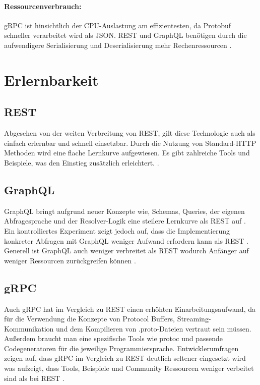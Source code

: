 \paragraph{Ressourcenverbrauch:}  
gRPC ist hinsichtlich der CPU-Auslastung am effizientesten, da Protobuf schneller verarbeitet wird als JSON. REST und GraphQL benötigen durch die aufwendigere Serialisierung und Deserialisierung mehr Rechenressourcen \parencite{Niswar2024PerformanceEvaluation,BergRedi2023Benchmarking}.

\section{Erlernbarkeit}

\subsection{REST}
Abgesehen von der weiten Verbreitung von REST, gilt diese Technologie auch als einfach erlernbar und schnell einsetzbar. Durch die Nutzung von Standard-HTTP Methoden wird eine flache Lernkurve aufgewiesen. Es gibt zahlreiche Tools und Beispiele, was den Einstieg zusätzlich erleichtert. \parencite{redhat-apiguide,postman2023}.

\subsection{GraphQL}
GraphQL bringt aufgrund neuer Konzepte wie, Schemas, Queries, der eigenen Abfragesprache und der Resolver-Logik eine steilere Lernkurve als REST auf \parencite{redhat-apiguide}.
Ein kontrolliertes Experiment zeigt jedoch auf, dass die Implementierung konkreter Abfragen mit GraphQL weniger Aufwand erfordern kann als REST \parencite{brito2020graphqlrest}. Generell ist GraphQL auch weniger verbreitet als REST wodurch Anfänger auf weniger Ressourcen zurückgreifen können
 \parencite{postman2023}.

\subsection{gRPC}

Auch gRPC hat im Vergleich zu REST einen erhöhten Einarbeitungsaufwand, da für die Verwendung die Konzepte von Protocol Buffers, Streaming-Kommunikation und dem Kompilieren von .proto-Dateien vertraut sein müssen. Außerdem braucht man eine spezifische Tools wie protoc und passende Codegeneratoren für die jeweilige Programmiersprache. Entwicklerumfragen  zeigen auf, dass gRPC im Vergleich zu REST deutlich seltener eingesetzt wird was aufzeigt, dass Tools, Beispiele und Community Ressourcen weniger verbeitet sind als bei REST \parencite{redhat-apiguide,gRPCAbout}.



\chapterend